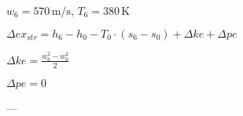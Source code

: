 \( w_6 = 570 \, \text{m/s}, \, T_6 = 380 \, \text{K} \)  

\( \Delta ex_{str} = h_6 - h_0 - T_0 \cdot (s_6 - s_0) + \Delta ke + \Delta pe \)  

\( \Delta ke = \frac{w_6^2 - w_0^2}{2} \)  

\( \Delta pe = 0 \)  

---